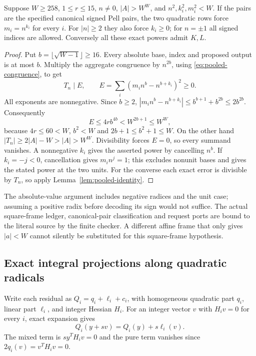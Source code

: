 \begin{theorem}
\label{thm:pooled-exactness}
Suppose $W\ge258$, $1\le r\le15$, $n\ne0$, $|A|>W^W$, and
$n^2,k_i^2,m_i^2<W$. If the pairs are the specified canonical signed
Pell pairs, the two quadratic rows force $m_i=n^{k_i}$ for every $i$.
For $|n|\ge2$ they also force $k_i\ge0$; for $n=\pm1$ all signed
indices are allowed. Conversely all these exact powers admit $K,L$.
\end{theorem}
\begin{proof}
Put $b=\lfloor\sqrt{W-1}\rfloor\ge16$. Every absolute base, index
and proposed output is at most $b$. Multiply the aggregate congruence
by $n^{2b}$, using \eqref{eq:pooled-congruence}, to get
\[
 T_n\mid E,\qquad
 E=\sum_i(m_in^b-n^{b+k_i})^2\ge0.
\]
All exponents are nonnegative. Since $b\ge2$,
$|m_in^b-n^{b+k_i}|\le b^{b+1}+b^{2b}\le2b^{2b}$.
Consequently
\[
 E\le4rb^{4b}<W^{2b+1}\le W^W,
\]
because $4r\le60<W$, $b^2<W$ and $2b+1\le b^2+1\le W$.
On the other hand
$|T_n|\ge2|A|-W>|A|>W^W$. Divisibility forces $E=0$,
so every summand vanishes. A nonnegative $k_i$ gives the asserted power
by cancelling $n^b$. If $k_i=-j<0$, cancellation gives $m_in^j=1$;
this excludes nonunit bases and gives the stated power at the two units.
For the converse each exact error is divisible by $T_n$, so apply
Lemma~\ref{lem:pooled-identity}.
\end{proof}
The absolute-value argument includes negative radices and the unit case;
assuming a positive radix before decoding its sign would not suffice.
The actual square-frame ledger, canonical-pair classification and
request ports are bound to the literal source by the finite checker.
A different affine frame that only gives $|a|<W$ cannot silently be
substituted for this square-frame hypothesis.

\subsection{Exact integral projections along quadratic radicals}
Write each residual as $Q_i=q_i+\ell_i+c_i$, with homogeneous quadratic
part $q_i$, linear part $\ell_i$, and integer Hessian $H_i$.
For an integer vector $v$ with $H_iv=0$ for every $i$, exact expansion gives
\begin{equation}\label{eq:radical-slope}
 Q_i(y+sv)=Q_i(y)+s\ell_i(v).
\end{equation}
The mixed term is $sy^TH_iv=0$ and the pure term vanishes since
$2q_i(v)=v^TH_iv=0$.

